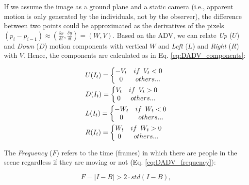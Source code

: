 If we assume the image as a ground plane and a static camera (i.e., apparent motion is only generated by the individuals, not by the observer), the difference between two points could be approximated as the derivatives of the pixels  $(p_i - p_{i-1}) \approx (\frac{\delta x}{\delta t},\frac{\delta y}{\delta t}) = (W,V)$. Based on the ADV, we can relate \textit{Up} ($U$) and \textit{Down} ($D$) motion components with vertical $W$ and \textit{Left} ($L$) and \textit{Right} ($R$) with $V$. Hence, the components are calculated as in Eq. \ref{eq:DADV_components}: 

\begin{equation}\label{eq:DADV_components}
    \begin{split}
    & U(I_t)=\left\{\begin{matrix} %
        -V_t  &  if \enskip V_t < 0  \\
        0     &  others...
    \end{matrix}
    \right.
    \\
    & D(I_t)=\left\{\begin{matrix} %
        V_t &  if \enskip V_t > 0  \\
        0   &  others...
    \end{matrix}
    \right.
    \\
    & L(I_t)=\left\{\begin{matrix} %
        -W_t  &  if \enskip W_t < 0  \\
        0     &  others...
    \end{matrix}
    \right.
    \\
    & R(I_t)=\left\{\begin{matrix} %
        W_t &  if \enskip W_t > 0  \\
        0   &  others...
    \end{matrix}
    \right.
    \end{split}
\end{equation}
 
The \textit{Frequency} ($F$) refers to the time (frames) in which there are people in the scene regardless if they are moving or not (Eq. \ref{eq:DADV_frequency}):

\begin{equation}\label{eq:DADV_frequency}
    F = | I - B | > 2 \cdot std(I-B),
\end{equation} 

